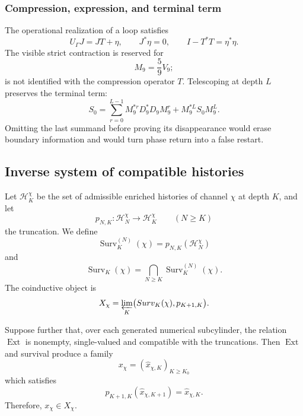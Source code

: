 \subsubsection{Compression, expression, and terminal term}

The operational realization of a loop satisfies
\begin{equation}
 U_\Gamma J=JT+\eta,
 \qquad
 J^*\eta=0,
 \qquad
 I-T^*T=\eta^*\eta.
 \label{p12-83-c9-s4:eq:compresion-expresion-precision}
\end{equation}
The visible strict contraction is reserved for
\[
 M_9=\frac59V_9;
\]
is not identified with the compression operator \(T\). Telescoping at
depth \(L\) preserves the terminal term:
\begin{equation}
 S_0=
 \sum_{r=0}^{L-1}M_9^{*r}D_9^*D_9M_9^r
 +M_9^{*L}S_0M_9^L.
 \label{p12-83-c9-s4:eq:telescopia-terminal-precision}
\end{equation}
Omitting the last summand before proving its disappearance would erase
boundary information and would turn phase return into a false
restart.

\subsection{Inverse system of compatible histories}

Let \(\mathcal H_K^\chi\) be the set of admissible enriched histories
of channel \(\chi\) at depth \(K\), and let
\[
 p_{N,K}:\mathcal H_N^\chi\longrightarrow\mathcal H_K^\chi
 \qquad(N\geq K)
\]
the truncation. We define
\[
 \operatorname{Surv}_K^{(N)}(\chi)
 =p_{N,K}(\mathcal H_N^\chi)
\]
and
\begin{equation}
 \operatorname{Surv}_K(\chi)
 =\bigcap_{N\geq K}\operatorname{Surv}_K^{(N)}(\chi).
 \label{p12-83-c9-s4:eq:supervivencia-todas-profundidades}
\end{equation}
The coinductive object is
\begin{equation}
 X_\chi=
 \varprojlim_K
 \bigl(\operatorname{Surv}_K(\chi),p_{K+1,K}\bigr).
 \label{p12-83-c9-s4:eq:limite-inverso-caracteres}
\end{equation}

\begin{theorem}
\label{p12-83-c9-s4:thm:seccion-compatible-caracteres}
Suppose further that, over each generated numerical subcylinder, the
relation \(\operatorname{Ext}\) is nonempty, single-valued and compatible with the
truncations. Then \(\operatorname{Ext}\) and survival produce a family
\[
 x_\chi=(\widehat x_{\chi,K})_{K\geq K_0}
\]
which satisfies
\[
 p_{K+1,K}(\widehat x_{\chi,K+1})
 =\widehat x_{\chi,K}.
\]
Therefore, \(x_\chi\in X_\chi\).
\end{theorem}

